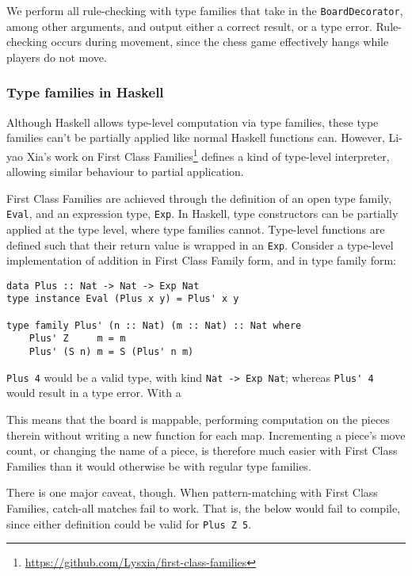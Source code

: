 \documentclass[12pt, a4paper, bibliography=totocnumbered]{scrartcl}
\begin{document}
We perform all rule-checking with type families that take in the \lstinline{BoardDecorator}, among other arguments, and output either a correct result, or a type error. Rule-checking occurs during movement, since the chess game effectively hangs while players do not move.

\subsubsection{Type families in Haskell}

Although Haskell allows type-level computation via type families, these type families can't be partially applied like normal Haskell functions can. However, Li-yao Xia's work on First Class Families\footnote{\url{https://github.com/Lysxia/first-class-families}} defines a kind of type-level interpreter, allowing similar behaviour to partial application.

First Class Families are achieved through the definition of an open type family, \lstinline{Eval}, and an expression type, \lstinline{Exp}. In Haskell, type constructors can be partially applied at the type level, where type families cannot. Type-level functions are defined such that their return value is wrapped in an \lstinline{Exp}. Consider a type-level implementation of addition in First Class Family form, and in type family form:

\begin{lstlisting}
data Plus :: Nat -> Nat -> Exp Nat
type instance Eval (Plus x y) = Plus' x y

type family Plus' (n :: Nat) (m :: Nat) :: Nat where
    Plus' Z     m = m
    Plus' (S n) m = S (Plus' n m)
\end{lstlisting}

\lstinline{Plus 4} would be a valid type, with kind \lstinline{Nat -> Exp Nat}; whereas \lstinline{Plus' 4} would result in a type error. With a 

This means that the board is mappable, performing computation on the pieces therein without writing a new function for each map. Incrementing a piece's move count, or changing the name of a piece, is therefore much easier with First Class Families than it would otherwise be with regular type families.

There is one major caveat, though. When pattern-matching with First Class Families, catch-all matches fail to work. That is, the below would fail to compile, since either definition could be valid for \lstinline{Plus Z 5}.
\end{document}
